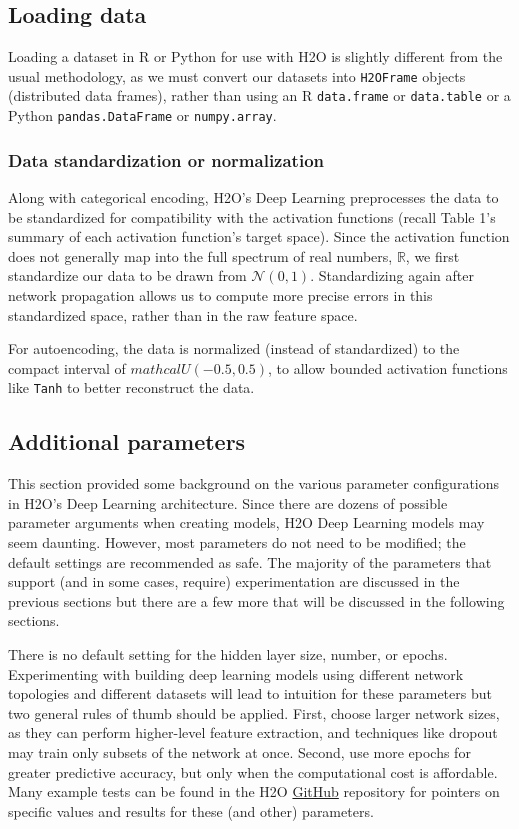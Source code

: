 \subsection{Loading data} 

Loading a dataset in R or Python for use with H2O is slightly different from the usual methodology, as we must convert our datasets into \texttt{H2OFrame} objects (distributed data frames), rather than using an R \texttt{data.frame} or \texttt{data.table} or a Python \texttt{pandas.DataFrame} or \texttt{numpy.array}. 

\subsubsection{Data standardization or normalization} 

Along with categorical encoding, H2O's Deep Learning preprocesses the data to be standardized for compatibility with the activation functions (recall Table 1's summary of each activation function's target space). Since the activation function does not generally map into the full spectrum of real numbers, $\mathbb{R}$, we first standardize our data to be drawn from $\mathcal{N}(0,1)$. Standardizing again after network propagation allows us to compute more precise errors in this standardized space, rather than in the raw feature space. 

For autoencoding, the data is normalized (instead of standardized) to the compact interval of $mathcal{U}(-0.5,0.5)$, to allow bounded activation functions like \texttt{Tanh} to better reconstruct the data.


\subsection{Additional parameters} 

This section provided some background on the various parameter configurations in H2O's Deep Learning architecture. Since there are dozens of possible parameter arguments when creating models, H2O Deep Learning models may seem daunting. However, most parameters do not need to be modified; the default settings are recommended as safe. The majority of the parameters that support (and in some cases, require) experimentation are discussed in the previous sections but there are a few more that will be discussed in the following sections. 

There is no default setting for the hidden layer size, number, or epochs. Experimenting with building deep learning models using different network topologies and different datasets will lead to intuition for these parameters but two general rules of thumb should be applied. First, choose larger network sizes, as they can perform higher-level feature extraction, and techniques like dropout may train only subsets of the network at once. Second, use more epochs for greater predictive accuracy, but only when the computational cost is affordable. Many example tests can be found in the H2O \href{https://github.com/h2oai/h2o-3/}{GitHub} repository for pointers on specific values and results for these (and other) parameters.

